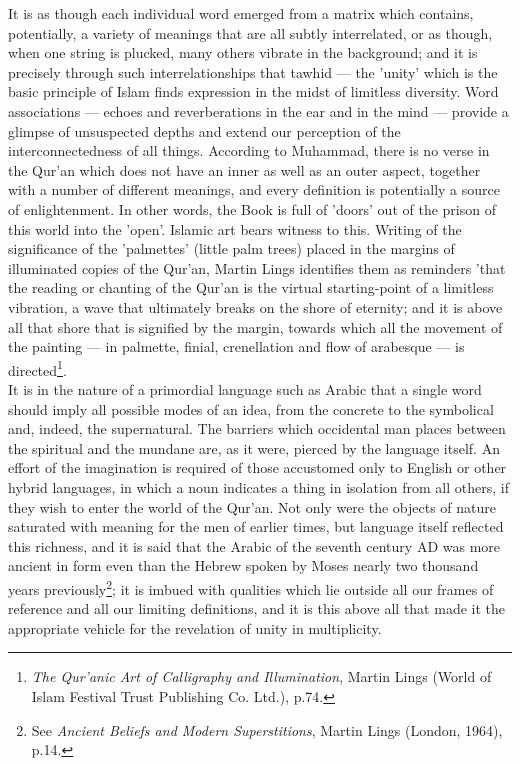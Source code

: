 \documentclass[11pt, b5paper, twoside]{book}
\begin{document}
It is as though each individual word emerged from a matrix which contains, potentially, a variety of 
meanings that are all subtly interrelated, or as though, when one string is plucked, many others 
vibrate in the background; and it is precisely through such interrelationships that tawhid --- the 
'unity' which is the basic principle of Islam finds expression in the midst of limitless diversity. 
Word associations --- echoes and reverberations in the ear and in the mind --- provide a glimpse of 
unsuspected depths and extend our perception of the interconnectedness of all things. According to 
Muhammad, there is no verse in the Qur'an which does not have an inner as well as an outer aspect, 
together with a number of different meanings, and every definition is potentially a source of 
enlightenment. In other words, the Book is full of 'doors' out of the prison of this world into the 
'open'. Islamic art bears witness to this. Writing of the significance of the 'palmettes' (little 
palm trees) placed in the margins of illuminated copies of the Qur'an, Martin Lings identifies them 
as reminders 'that the reading or chanting of the Qur'an is the virtual starting-point of a limitless 
vibration, a wave that ultimately breaks on the shore of eternity; and it is above all that shore 
that is signified by the margin, towards which all the movement of the painting --- in palmette, 
finial, crenellation and flow of arabesque --- is directed\footnote{\emph{The Qur'anic Art of Calligraphy and Illumination}, Martin Lings (World of Islam Festival Trust Publishing Co. Ltd.), p.74.}. \\

It is in the nature of a primordial language such as Arabic that a single word should imply all 
possible modes of an idea, from the concrete to the symbolical and, indeed, the supernatural. The 
barriers which occidental man places between the spiritual and the mundane are, as it were, pierced 
by the language itself. An effort of the imagination is required of those accustomed only to English 
or other hybrid languages, in which a noun indicates a thing in isolation from all others, if they 
wish to enter the world of the Qur'an. Not only were the objects of nature saturated with meaning for 
the men of earlier times, but language itself reflected this richness, and it is said that the Arabic 
of the seventh century AD was more ancient in form even than the Hebrew spoken by Moses nearly two 
thousand years previously\footnote{See \emph{Ancient Beliefs and Modern Superstitions}, Martin Lings (London, 1964), p.14.}; it is imbued with qualities which lie outside all our frames of reference and all our limiting definitions, and it is this above all that made it the appropriate vehicle for the revelation of unity in multiplicity. \\
\end{document}
